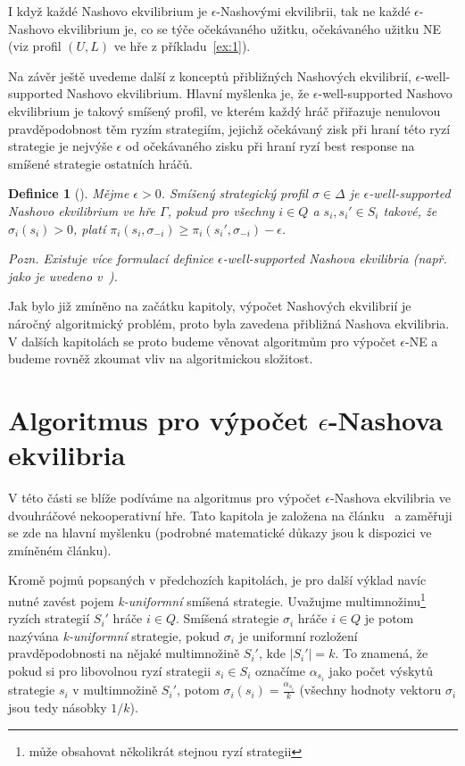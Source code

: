 \documentclass[a4paper,12pt]{article}
\newtheorem{definition}{Definice}
\begin{document}
I když každé Nashovo ekvilibrium je  $\epsilon$-Nashovými ekvilibrii, tak ne každé $\epsilon$-Nashovo 
ekvilibrium je, co se týče očekávaného užitku,  očekávaného užitku NE (viz profil $(U, L)$ ve hře z příkladu~\ref{ex:1}).

Na závěr ještě uvedeme další z konceptů přibližných Nashových ekvilibrií, $\epsilon$-well-supported Nashovo ekvilibrium.
Hlavní myšlenka je, že $\epsilon$-well-supported Nashovo ekvilibrium je takový smíšený profil, ve kterém každý hráč přiřazuje nenulovou 
pravděpodobnost těm ryzím strategiím, jejichž očekávaný zisk při hraní této ryzí strategie je nejvýše $\epsilon$ od očekávaného zisku při hraní ryzí best response na smíšené strategie ostatních hráčů.

\begin{definition}[\cite{Daskalakis}]
  Mějme $\epsilon > 0$. Smíšený strategický profil $\sigma \in\Delta$ je $\epsilon$-well-supported Nashovo ekvilibrium ve hře $\Gamma$, pokud
  pro všechny $i\in Q$ a $s_i, s_i'\in S_i$ takové, že $\sigma_i(s_i) > 0$, platí $\pi_i(s_i, \sigma_{-i}) \geq \pi_i(s_i', \sigma_{-i}) - \epsilon$.
\end{definition}

\emph{Pozn.  Existuje více formulací definice $\epsilon$-well-supported Nashova ekvilibria (např. jako je uvedeno v~\cite{dp}).}

Jak bylo již zmíněno na začátku kapitoly, výpočet Nashových ekvilibrií je náročný algoritmický problém, proto byla zavedena přibližná 
Nashova ekvilibria. V dalších kapitolách se proto budeme
věnovat algoritmům pro výpočet $\epsilon$-NE a budeme rovněž zkoumat vliv na algoritmickou složitost.

\section{Algoritmus pro výpočet $\epsilon$-Nashova ekvilibria}
V této části se blíže podíváme na algoritmus pro výpočet $\epsilon$-Nashova ekvilibria ve dvouhráčové nekooperativní hře. Tato kapitola je založena na 
článku~\cite{Lipton:2003:PLG:779928.779933} a zaměřuji se zde na hlavní myšlenku (podrobné matematické důkazy jsou k dispozici ve zmíněném článku).

Kromě pojmů popsaných v předchozích kapitolách, je pro další výklad navíc nutné zavést pojem \emph{k-uniformní} smíšená strategie. 
Uvažujme multimnožinu\footnote{může obsahovat několikrát stejnou ryzí strategii} ryzích strategií $S_i'$ hráče $i\in Q$. Smíšená strategie $\sigma_i$ 
hráče $i \in Q$ je potom nazývána \emph{k-uniformní} strategie, pokud $\sigma_i$ je uniformní rozložení pravděpodobnosti na nějaké multimnožině $S_i'$, kde 
$|S_i'| = k$. To znamená, že pokud si pro libovolnou ryzí strategii $s_i \in S_i$ označíme $\alpha_{s_i}$ jako počet výskytů strategie $s_i$ v multimnožině $S_i'$, potom 
$\sigma_i(s_i) = \frac{\alpha_{s_i}}{k}$ (všechny hodnoty vektoru $\sigma_i$ jsou tedy násobky $1/k$).
\end{document}
